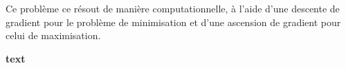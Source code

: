 \documentclass[letterpaper]{oup-contemporary}
\begin{document}
Ce problème ce résout de manière computationnelle, à l'aide d'une descente de gradient pour le problème de minimisation et d'une ascension de gradient pour celui de maximisation. 

\begin{algorithm}
	\caption{\textbf{text}}
	\begin{algorithmic}[1]
	    \STATE {$\text{}$}
	\end{algorithmic}
\end{algorithm}

%
\end{document}
